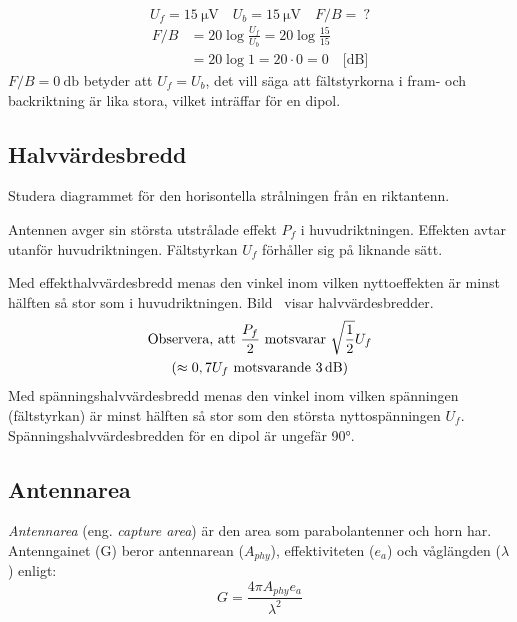 \begin{exempelbox}
\noindent
\[ U_f = \qty{15}{\micro\volt} \quad U_b = \qty{15}{\micro\volt} \quad F/B =\ ? \]
\tcblower
\noindent
\begin{align*}
  F/B &= 20 \log\frac{U_f}{U_b} = 20 \log\frac{15}{15} \\
  &= 20 \log 1 = 20 \cdot 0 = 0 \quad \text{[dB]}
\end{align*}
\(F/B = \qty{0}{\decibel}\) betyder att \(U_f = U_b\), det vill säga att
fältstyrkorna i fram- och backriktning är lika stora, vilket inträffar för en
dipol.
\end{exempelbox}

\subsection{Halvvärdesbredd}

Studera diagrammet för den horisontella strålningen från en riktantenn.

Antennen avger sin största utstrålade effekt \(P_f\) i huvudriktningen.
Effekten avtar utanför huvudriktningen.
Fältstyrkan \(U_f\) förhåller sig på liknande sätt.

Med effekthalvvärdesbredd menas den vinkel inom vilken nyttoeffekten
är minst hälften så stor som i huvudriktningen.
Bild~ visar halvvärdesbredder.
\begin{gather*}
  \text{Observera, att } \frac{P_f}{2} \text{ motsvarar }
  \sqrt{\frac{1}{2}}U_f \\
  ( \approx 0,7 U_f \text{ motsvarande \qty{3}{\decibel}})
\end{gather*}
Med spänningshalvvärdesbredd menas den vinkel inom vilken spänningen
(fältstyrkan) är minst hälften så stor som den största nyttospänningen \(U_f\).
Spänningshalvvärdesbredden för en dipol är ungefär \ang{90}.


\subsection{Antennarea}

\emph{Antennarea} (eng. \emph{capture area}) är den area som parabolantenner
och horn har.
Antenngainet (G) beror antennarean (\(A_{phy}\)), effektiviteten (\(e_a\)) och
våglängden (\(\lambda\)) enligt:
\[ G = \frac{4\pi A_{phy}e_a}{\lambda^2} \]
